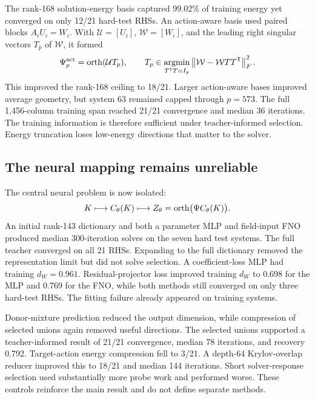 The rank-168 solution-energy basis captured 99.02\% of training energy yet converged on only 12/21 hard-test RHSs. An action-aware basis used paired blocks $A_iU_i=W_i$. With $\mathcal U=[U_i]$, $\mathcal W=[W_i]$, and the leading right singular vectors $T_p$ of $\mathcal W$, it formed
\begin{equation}
 \Psi_p^{\rm act}=\operatorname{orth}(\mathcal U T_p),
 \qquad
 T_p\in\underset{T^{\mathsf T} T=I_p}{\operatorname{argmin}}
 \left\lVert \mathcal W-\mathcal WTT^{\mathsf T}\right\rVert_F^2.
 \label{eq:residual-aware-dictionary}
\end{equation}
This improved the rank-168 ceiling to 18/21. Larger action-aware bases improved average geometry, but system 63 remained capped through $p=573$. The full 1,456-column training span reached 21/21 convergence and median 36 iterations. The training information is therefore sufficient under teacher-informed selection. Energy truncation loses low-energy directions that matter to the solver.

\subsection{The neural mapping remains unreliable}

The central neural problem is now isolated:
\begin{equation}
 K\longmapsto C_\theta(K)\longmapsto
 Z_\theta=\operatorname{orth}\bigl(\Psi C_\theta(K)\bigr).
 \label{eq:field-to-dictionary}
\end{equation}
An initial rank-143 dictionary and both a parameter MLP and field-input FNO produced median 300-iteration solves on the seven hard test systems. The full teacher converged on all 21 RHSs. Expanding to the full dictionary removed the representation limit but did not solve selection. A coefficient-loss MLP had training $d_W=0.961$. Residual-projector loss improved training $d_W$ to 0.698 for the MLP and 0.769 for the FNO, while both methods still converged on only three hard-test RHSs. The fitting failure already appeared on training systems.

Donor-mixture prediction reduced the output dimension, while compression of selected unions again removed useful directions. The selected unions supported a teacher-informed result of 21/21 convergence, median 78 iterations, and recovery 0.792. Target-action energy compression fell to 3/21. A depth-64 Krylov-overlap reducer improved this to 18/21 and median 144 iterations. Short solver-response selection used substantially more probe work and performed worse. These controls reinforce the main result and do not define separate methods.

